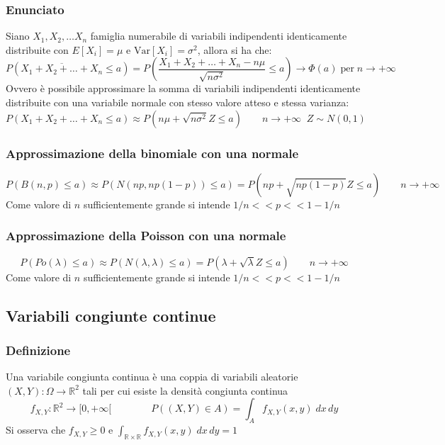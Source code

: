 \documentclass[a4paper]{article}
\newcommand\R{\mathbb{R}}     %
\newcommand\Rd{\mathbb{R}^2}  %
\newcommand\var{\text{Var}}   %
\begin{document}
\subsubsection*{Enunciato}
Siano \(X_1, X_2, \dots X_n\) famiglia numerabile di variabili indipendenti identicamente distribuite con \(E[X_i] = \mu\) e
\(\var[X_i] = \sigma^2\), allora si ha che:
\[P\left(\overline{X_1 + X_2 + \dots + X_n} \leq a\right) = P\left(\frac{X_1 + X_2 + \dots + X_n - n \mu}{\sqrt{n \sigma^2}} \leq a\right) \rightarrow \Phi(a) \; \text{per} \; n \to +\infty\]
Ovvero è possibile approssimare la somma di variabili indipendenti identicamente distribuite con una variabile normale con 
stesso valore atteso e stessa varianza:
\[P(X_1 + X_2 + \dots + X_n \leq a) \approx P(n\mu + \sqrt{n \sigma^2} Z \leq a) \qquad n \to +\infty \;\; Z \sim N(0,1)\]

\subsubsection*{Approssimazione della binomiale con una normale}
\[P(B(n,p) \leq a) \approx P(N(np,np(1-p)) \leq a) = P(np + \sqrt{np(1-p)} Z \leq a) \qquad n \to +\infty\]
Come valore di \(n\) sufficientemente grande si intende \(1/n << p << 1-1/n\)

\subsubsection*{Approssimazione della Poisson con una normale}
\[P(Po(\lambda) \leq a) \approx P(N(\lambda,\lambda) \leq a) = P(\lambda + \sqrt{\lambda} Z \leq a) \qquad n \to +\infty\]
Come valore di \(n\) sufficientemente grande si intende \(1/n << p << 1-1/n\)

\newpage

\subsection{Variabili congiunte continue}
\subsubsection*{Definizione}
Una variabile congiunta continua è una coppia di variabili aleatorie \((X,Y) : \Omega \to \Rd\) tali per cui esiste la densità
congiunta continua \[f_{X,Y} : \Rd \to [0, +\infty[ \qquad \qquad P((X,Y) \in A) = \int_A f_{X,Y} (x,y) \; dx \, dy\]
Si osserva che \(f_{X,Y} \geq 0\) e \(\displaystyle \int_{\R \times \R} f_{X,Y}(x,y) \; dx \, dy = 1\)
\end{document}

